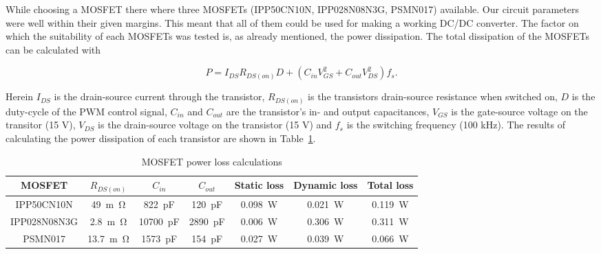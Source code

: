 \documentclass[11pt,titlepage]{report}
\begin{document}
While choosing a MOSFET	there where three MOSFETs (IPP50CN10N, IPP028N08N3G, PSMN017) available. Our circuit parameters were well within their given margins. This meant that all of them could be used for making a working DC/DC converter. The factor on which the suitability of each MOSFETs was tested is, as already mentioned, the power dissipation. The total dissipation of the MOSFETs can be calculated with

\begin{equation}
P = I_{DS}R_{DS(on)}D +	(C_{in}V_{GS}^2 + C_{out}V_{DS}^2)f_{s}.
\end{equation}

Herein $I_{DS}$ is the drain-source current through the transistor, $R_{DS(on)}$ is the transistors drain-source resistance when switched on, $D$ is the duty-cycle of the PWM control signal, $C_{in}$ and $C_{out}$ are the transistor’s in- and output capacitances, $V_{GS}$ is the gate-source voltage on the
transitor (15 V), $V_{DS}$ is the drain-source voltage on the transistor (15 V) and $f_{s}$ is the switching frequency (100 kHz).  The results of calculating the power dissipation of each transistor are shown in Table~\ref{tab:ass2_powerloss}. 

\begin{table}[H]
	\centering
	\begin{tabular}{c c c c c c c}
		\hline\hline
		MOSFET & $R_{DS(on)}$ & $C_{in}$ & $C_{out}$ & Static loss & Dynamic loss & Total loss \\
		\hline
		IPP50CN10N & \SI{49}{m\ohm} & \SI{822}{pF} & \SI{120}{pF} & \SI{0.098}{W} & \SI{0.021}{W} & \SI{0.119}{W} \\
		IPP028N08N3G & \SI{2.8}{m\ohm} & \SI{10700}{pF} & \SI{2890}{pF} & \SI{0.006}{W} & \SI{0.306}{W} & \SI{0.311}{W} \\
		PSMN017 & \SI{13.7}{m\ohm} & \SI{1573}{pF} & \SI{154}{pF} & \SI{0.027}{W} & \SI{0.039}{W} & \SI{0.066}{W} \\
		\hline
		\end{tabular}
		\caption{MOSFET power loss calculations}
	    \label{tab:ass2_powerloss}
\end{table}
\end{document}
